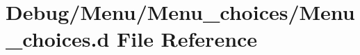\hypertarget{_menu__choices_8d}{}\section{Debug/\+Menu/\+Menu\+\_\+choices/\+Menu\+\_\+choices.d File Reference}
\label{_menu__choices_8d}

